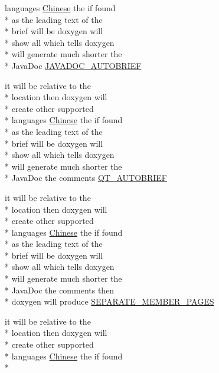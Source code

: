 \begin{DoxyCompactItemize}
languages \hyperlink{mkdoc_8dox_ab6ff97d2e5e9fa61c208d5f0eee91c62}{Chinese} the if found \\*
as the leading text of the \\*
brief will be doxygen will \\*
show all which tells doxygen \\*
will generate much shorter the \\*
Java\-Doc \hyperlink{mkdoc_8dox_aabdcd7fd8cfe4a4c6f9ad5b932398ab2}{J\-A\-V\-A\-D\-O\-C\-\_\-\-A\-U\-T\-O\-B\-R\-I\-E\-F}
\item 
it will be relative to the \\*
location then doxygen will \\*
create other supported \\*
languages \hyperlink{mkdoc_8dox_ab6ff97d2e5e9fa61c208d5f0eee91c62}{Chinese} the if found \\*
as the leading text of the \\*
brief will be doxygen will \\*
show all which tells doxygen \\*
will generate much shorter the \\*
Java\-Doc the comments \hyperlink{mkdoc_8dox_ac0b206976e7e9c2197ff6f4a6104ed56}{Q\-T\-\_\-\-A\-U\-T\-O\-B\-R\-I\-E\-F}
\item 
it will be relative to the \\*
location then doxygen will \\*
create other supported \\*
languages \hyperlink{mkdoc_8dox_ab6ff97d2e5e9fa61c208d5f0eee91c62}{Chinese} the if found \\*
as the leading text of the \\*
brief will be doxygen will \\*
show all which tells doxygen \\*
will generate much shorter the \\*
Java\-Doc the comments then \\*
doxygen will produce \hyperlink{mkdoc_8dox_ad72e646b31fc3060000bd36feea98bbc}{S\-E\-P\-A\-R\-A\-T\-E\-\_\-\-M\-E\-M\-B\-E\-R\-\_\-\-P\-A\-G\-E\-S}
\item 
it will be relative to the \\*
location then doxygen will \\*
create other supported \\*
languages \hyperlink{mkdoc_8dox_ab6ff97d2e5e9fa61c208d5f0eee91c62}{Chinese} the if found \\*

\end{DoxyCompactItemize}
